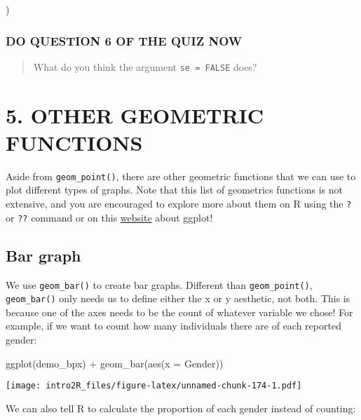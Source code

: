 \documentclass[
]{book}
\newenvironment{Shaded}{\begin{snugshade}}{\end{snugshade}}
\newcommand{\AttributeTok}[1]{\textcolor[rgb]{0.77,0.63,0.00}{#1}}
\newcommand{\FunctionTok}[1]{\textcolor[rgb]{0.00,0.00,0.00}{#1}}
\newcommand{\NormalTok}[1]{#1}
\newcommand{\SpecialCharTok}[1]{\textcolor[rgb]{0.00,0.00,0.00}{#1}}
\begin{document}
)

\hypertarget{do-question-6-of-the-quiz-now-1}{%
\subsubsection{DO QUESTION 6 OF THE QUIZ NOW}\label{do-question-6-of-the-quiz-now-1}}

\begin{quote}
What do you think the argument \texttt{se\ =\ FALSE} does?
\end{quote}

\hypertarget{other-geometric-functions}{%
\section{5. OTHER GEOMETRIC FUNCTIONS}\label{other-geometric-functions}}

Aside from \texttt{geom\_point()}, there are other geometric functions that we can use to plot different types of graphs. Note that this list of geometrics functions is not extensive, and you are encouraged to explore more about them on R using the \texttt{?} or \texttt{??} command or on this \href{https://ggplot2.tidyverse.org/reference/}{website} about ggplot!

\hypertarget{bar-graph}{%
\subsection{Bar graph}\label{bar-graph}}

We use \texttt{geom\_bar()} to create bar graphs. Different than \texttt{geom\_point()}, \texttt{geom\_bar()} only needs us to define either the x or y aesthetic, not both. This is because one of the axes needs to be the count of whatever variable we chose! For example, if we want to count how many individuals there are of each reported gender:

\begin{Shaded}
\begin{Highlighting}[]
\FunctionTok{ggplot}\NormalTok{(demo\_bpx) }\SpecialCharTok{+}
    \FunctionTok{geom\_bar}\NormalTok{(}\FunctionTok{aes}\NormalTok{(}\AttributeTok{x =}\NormalTok{ Gender))}
\end{Highlighting}
\end{Shaded}

\texttt{[image: intro2R\_files/figure-latex/unnamed-chunk-174-1.pdf]}

We can also tell R to calculate the proportion of each gender instead of counting:
\end{document}
